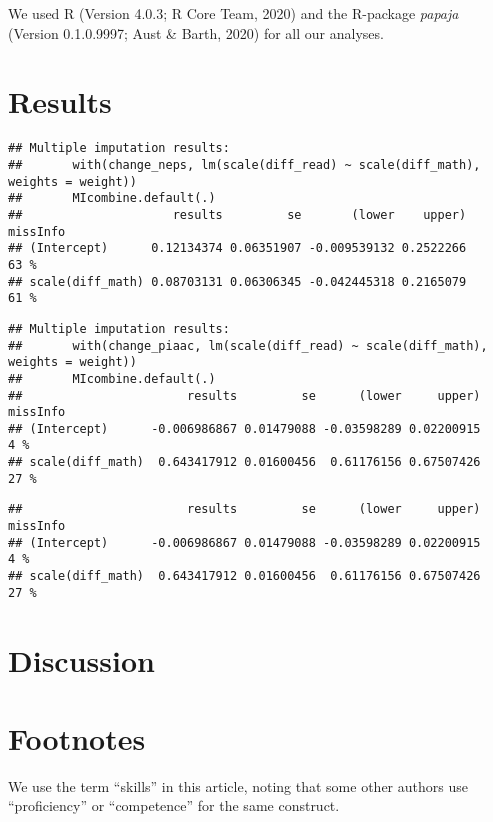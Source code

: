 \documentclass[
  english,
  man]{apa6}
\begin{document}
We used R (Version 4.0.3; R Core Team, 2020) and the R-package \emph{papaja} (Version 0.1.0.9997; Aust \& Barth, 2020) for all our analyses.

\hypertarget{results}{%
\section{Results}\label{results}}

\begin{verbatim}
## Multiple imputation results:
##       with(change_neps, lm(scale(diff_read) ~ scale(diff_math), weights = weight))
##       MIcombine.default(.)
##                     results         se       (lower    upper) missInfo
## (Intercept)      0.12134374 0.06351907 -0.009539132 0.2522266     63 %
## scale(diff_math) 0.08703131 0.06306345 -0.042445318 0.2165079     61 %
\end{verbatim}

\begin{verbatim}
## Multiple imputation results:
##       with(change_piaac, lm(scale(diff_read) ~ scale(diff_math), weights = weight))
##       MIcombine.default(.)
##                       results         se      (lower     upper) missInfo
## (Intercept)      -0.006986867 0.01479088 -0.03598289 0.02200915      4 %
## scale(diff_math)  0.643417912 0.01600456  0.61176156 0.67507426     27 %
\end{verbatim}

\begin{verbatim}
##                       results         se      (lower     upper) missInfo
## (Intercept)      -0.006986867 0.01479088 -0.03598289 0.02200915      4 %
## scale(diff_math)  0.643417912 0.01600456  0.61176156 0.67507426     27 %
\end{verbatim}

\hypertarget{discussion}{%
\section{Discussion}\label{discussion}}

\hypertarget{footnotes}{%
\section{Footnotes}\label{footnotes}}

We use the term \enquote{skills} in this article, noting that some other authors use \enquote{proficiency} or \enquote{competence} for the same construct.
\end{document}
